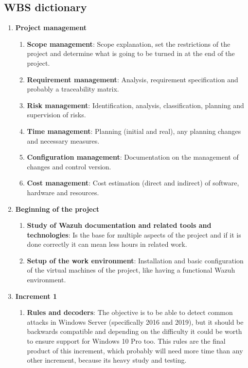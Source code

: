 \subsection{WBS dictionary}
\begin{enumerate}
	\item \textbf{Project management}
	\begin{enumerate}[label=\alph*]
		\item \textbf{Scope management}: Scope explanation, set the restrictions of the project and determine what is going to be turned in at the end of the project.
		\item \textbf{Requirement management}: Analysis, requirement specification and probably a traceability matrix.
		\item \textbf{Risk management}: Identification, analysis, classification, planning and supervision of risks.
		\item \textbf{Time management}: Planning (initial and real), any planning changes and necessary measures.
		\item \textbf{Configuration management}: Documentation on the management of changes and control version.
		\item \textbf{Cost management}: Cost estimation (direct and indirect) of software, hardware and resources.
	\end{enumerate}

	\item \textbf{Beginning of the project}
	\begin{enumerate}[label=\alph*]
		\item \textbf{Study of Wazuh documentation and related tools and technologies}: Is the base for multiple aspects of the project and if it is done correctly it can mean less hours in related work.
		\item \textbf{Setup of the work environment}: Installation and basic configuration of the virtual machines of the project, like having a functional Wazuh environment.
	\end{enumerate}

	\item \textbf{Increment 1}
	\begin{enumerate}[label=\alph*]
		\item \textbf{Rules and decoders}: The objective is to be able to detect common attacks in Windows Server (specifically 2016 and 2019), but it should be backwards compatible and depending on the difficulty it could be worth to ensure support for Windows 10 Pro too. This rules are the final product of this increment, which probably will need more time than any other increment, because its heavy study and testing.
	\end{enumerate}


\end{enumerate}
